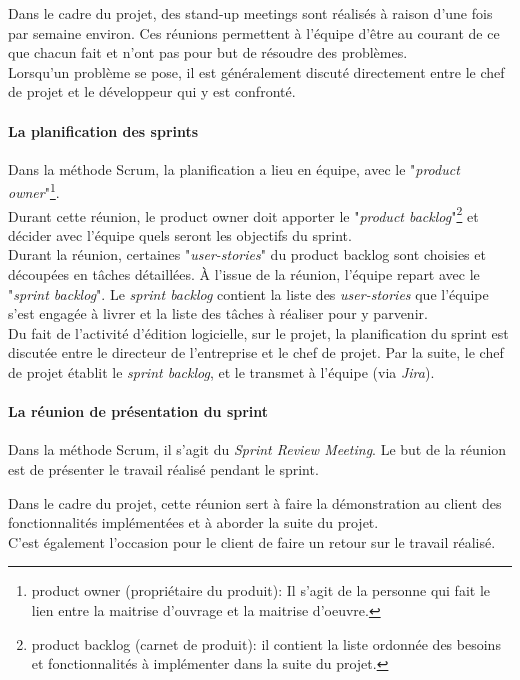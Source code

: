 Dans le cadre du projet, des stand-up meetings sont réalisés à raison d'une fois par semaine environ. Ces réunions permettent à l'équipe d'être au courant de ce que chacun fait et n'ont pas pour but de résoudre des problèmes.\\
Lorsqu'un problème se pose, il est généralement discuté directement entre le chef de projet et le développeur qui y est confronté.

\paragraph*{La planification des sprints\\}
Dans la méthode Scrum, la planification a lieu en équipe\cite{bib:springPlanning}, avec le "\textit{product owner}"\footnote{product owner (propriétaire du produit): Il s'agit de la personne qui fait le lien entre la maitrise d'ouvrage et la maitrise d'oeuvre.}. \\
Durant cette réunion, le product owner doit apporter le "\textit{product backlog}"\footnote{product backlog (carnet de produit): il contient la liste ordonnée des besoins et fonctionnalités à implémenter dans la suite du projet.} et décider avec l'équipe quels seront les objectifs du sprint.\\
Durant la réunion, certaines "\textit{user-stories}" du product backlog sont choisies et découpées en tâches détaillées. À l'issue de la réunion, l'équipe repart avec le "\textit{sprint backlog}". Le \textit{sprint backlog} contient la liste des \textit{user-stories} que l'équipe s'est engagée à livrer et la liste des tâches à réaliser pour y parvenir.\\

Du fait de l'activité d'édition logicielle, sur le projet, la planification du sprint est discutée entre le directeur de l'entreprise et le chef de projet. Par la suite, le chef de projet établit le \textit{sprint backlog}, et le transmet à l'équipe (via \textit{Jira}).

\paragraph*{La réunion de présentation du sprint\\}
Dans la méthode Scrum, il s'agit du \textit{Sprint Review Meeting}. Le but de la réunion est de présenter le travail réalisé pendant le sprint. 

Dans le cadre du projet, cette réunion sert à faire la démonstration au client des fonctionnalités implémentées et à aborder la suite du projet.\\
C'est également l'occasion pour le client de faire un retour sur le travail réalisé.

